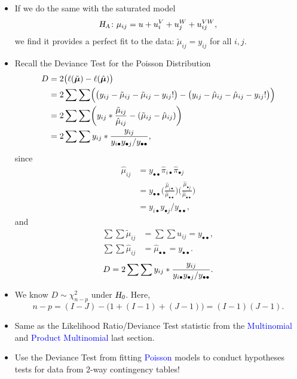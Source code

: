 \documentclass[oneside]{book}\usepackage[]{graphicx}\usepackage[svgnames]{xcolor}
\let\log\relax%
\newcommand{\HN}{\textsl{H}_{\textsl{0}}}%
\newcommand{\HA}{\textsl{H}_{\textsl{A}}}%
\providecommand{\Vector}[1]{\bm{#1}}%
\begin{document}
\begin{itemize}
      \item If we do the same with the saturated model
            \[ \HA\colon\log{\mu_{ij}}=u+u_i^V+u_j^W+u_{ij}^{VW}, \]
            we find it provides a perfect fit to the data: $ \tilde{\mu}_{ij}=y_{ij} $ for all $ i,j $.
      \item Recall the Deviance Test for the Poisson Distribution
            \begin{align*}
                  D
                   & =2\bigl(\ell(\tilde{\Vector{\mu}})-\ell(\hat{\Vector{\mu}})\bigr)                                                                                                   \\
                   & =2\sum\sum\Bigl(\bigl(y_{ij}-\log{\tilde{\mu}_{ij}}-\tilde{\mu}_{ij}-\log{y_{ij}!}\bigr)-\bigl(y_{ij}-\log{\hat{\mu}_{ij}}-\hat{\mu}_{ij}-\log{y_{ij}!}\bigr)\Bigr) \\
                   & =2\sum\sum\biggl(y_{ij}\log*{\frac{\tilde{\mu}_{ij}}{\hat{\mu}_{ij}}}-(\tilde{\mu}_{ij}-\hat{\mu}_{ij})\biggr)                                                      \\
                   & =2\sum\sum y_{ij}\log*{\frac{y_{ij}}{y_{i\bullet}y_{\bullet j}/y_{\bullet\bullet}}},
            \end{align*}
            since
            \begin{align*}
                  \hat{\mu}_{ij}
                   & =y_{\bullet\bullet}\hat{\pi}_{i\bullet}\hat{\pi}_{\bullet j}                                                                                                   \\
                   & =y_{\bullet\bullet}\biggl(\frac{\hat{\mu}_{i\bullet}}{\hat{\mu}_{\bullet\bullet}}\biggr)\biggl(\frac{\hat{\mu}_{\bullet j}}{\hat{\mu}_{\bullet\bullet}}\biggr) \\
                   & =y_{i\bullet}y_{\bullet j}/y_{\bullet\bullet},
            \end{align*}
            and
            \begin{align*}
                  \sum\sum\tilde{\mu}_{ij} & =\sum\sum u_{ij}=y_{\bullet\bullet},            \\
                  \sum\sum\hat{\mu}_{ij}   & =\hat{\mu}_{\bullet\bullet}=y_{\bullet\bullet}.
            \end{align*}
            \[ D=2\sum\sum y_{ij}\log*{\frac{y_{ij}}{y_{i\bullet}y_{\bullet j}/y_{\bullet\bullet}}}. \]
      \item We know $ D \sim \chi^2_{n-p} $ under $ \HN $. Here,
            \[ n-p=(I-J)-\bigl(1+(I-1)+(J-1)\bigr)=(I-1)(J-1). \]
      \item Same as the Likelihood Ratio/Deviance Test statistic from the \textcolor{Blue}{Multinomial} and
            \textcolor{Blue}{Product Multinomial} last section.
      \item Use the Deviance Test from fitting \textcolor{Blue}{Poisson} models to conduct hypotheses tests
            for data from 2-way contingency tables!
\end{itemize}
\end{document}
